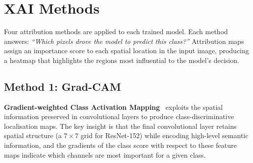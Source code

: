 \documentclass[12pt, a4paper]{article}
\begin{document}
\section{XAI Methods}
\label{sec:xai_methods}

Four attribution methods are applied to each trained model.  Each method
answers: \textit{``Which pixels drove the model to predict this class?''}
Attribution maps assign an importance score to each spatial location in the
input image, producing a heatmap that highlights the regions most influential
to the model's decision.

\subsection{Method 1: Grad-CAM}

\textbf{Gradient-weighted Class Activation Mapping}~\cite{selvaraju2017gradcam}
exploits the spatial information preserved in convolutional layers to produce
class-discriminative localisation maps.  The key insight is that the final
convolutional layer retains spatial structure (a $7 \times 7$ grid for
ResNet-152) while encoding high-level semantic information, and the gradients
of the class score with respect to these feature maps indicate which channels
are most important for a given class.
\end{document}
